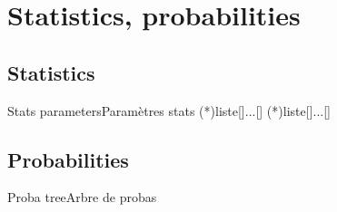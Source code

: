 \documentclass[a4paper,english,11pt]{article}
\begin{document}
%

\newpage

\section{Statistics, probabilities}

\subsection{Statistics}

\begin{myprestexcode}{Stats parameters}{Paramètres stats}
\DeterminerParamStats(*){liste}[\macromin]...[\macromax]
\pflparamstats(*){liste}[\macromin]...[\macromax]

\end{myprestexcode}


\subsection{Probabilities}

\begin{myprestexcode}{Proba tree}{Arbre de probas}

\end{myprestexcode}
\end{document}

